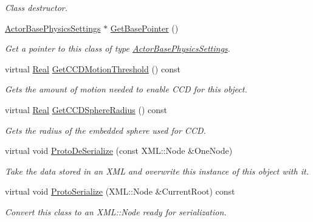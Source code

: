 \begin{DoxyCompactItemize}
\begin{DoxyCompactList}\small\item\em Class destructor. \end{DoxyCompactList}\item 
\hyperlink{classMezzanine_1_1ActorBasePhysicsSettings}{Actor\-Base\-Physics\-Settings} $\ast$ \hyperlink{classMezzanine_1_1ActorBasePhysicsSettings_ae43e2938e30b69ac11627b9648c43415}{Get\-Base\-Pointer} ()
\begin{DoxyCompactList}\small\item\em Get a pointer to this class of type \hyperlink{classMezzanine_1_1ActorBasePhysicsSettings}{Actor\-Base\-Physics\-Settings}. \end{DoxyCompactList}\item 
virtual \hyperlink{namespaceMezzanine_a726731b1a7df72bf3583e4a97282c6f6}{Real} \hyperlink{classMezzanine_1_1ActorBasePhysicsSettings_a804941eb77d960dd3c73d331c47c891c}{Get\-C\-C\-D\-Motion\-Threshold} () const 
\begin{DoxyCompactList}\small\item\em Gets the amount of motion needed to enable C\-C\-D for this object. \end{DoxyCompactList}\item 
virtual \hyperlink{namespaceMezzanine_a726731b1a7df72bf3583e4a97282c6f6}{Real} \hyperlink{classMezzanine_1_1ActorBasePhysicsSettings_a3729e8ee88bc2d8892d921016aa4a4c0}{Get\-C\-C\-D\-Sphere\-Radius} () const 
\begin{DoxyCompactList}\small\item\em Gets the radius of the embedded sphere used for C\-C\-D. \end{DoxyCompactList}\item 
virtual void \hyperlink{classMezzanine_1_1ActorBasePhysicsSettings_a6410a001b1d8a932ea87f66ed50cdc31}{Proto\-De\-Serialize} (const X\-M\-L\-::\-Node \&One\-Node)
\begin{DoxyCompactList}\small\item\em Take the data stored in an X\-M\-L and overwrite this instance of this object with it. \end{DoxyCompactList}\item 
virtual void \hyperlink{classMezzanine_1_1ActorBasePhysicsSettings_a56059cc085ceab1167ce96f1b63b0e4d}{Proto\-Serialize} (X\-M\-L\-::\-Node \&Current\-Root) const 
\begin{DoxyCompactList}\small\item\em Convert this class to an X\-M\-L\-::\-Node ready for serialization. \end{DoxyCompactList}\item 

\end{DoxyCompactItemize}
